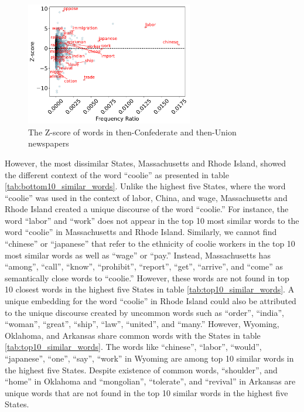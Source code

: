 \documentclass[11pt]{article}
\begin{document}
  \begin{figure}[h!]
    \centering
    \includegraphics[width=0.65\textwidth]{z-score-token-union-confederate.pdf}
    \caption{The Z-score of words in then-Confederate and then-Union newspapers}
    \label{fig:zscore}
  \end{figure}

However, the most dissimilar States, Massachusetts and Rhode Island, showed the different context of the word ``coolie''
as presented in table \ref{tab:bottom10_similar_words}. Unlike the highest five States, where the word ``coolie'' was used in the context of
labor, China, and wage, Massachusetts and Rhode Island created a unique discourse of the word ``coolie.''
For instance, the word ``labor'' and ``work'' does not appear in the top 10 most similar words to the word ``coolie'' in Massachusetts and Rhode Island.
Similarly, we cannot find ``chinese'' or ``japanese'' that refer to the ethnicity of coolie workers in the top 10 most similar words as well as ``wage'' or ``pay.''
Instead, Massachusetts has ``among'', ``call'', ``know'', ``prohibit'', ``report'', ``get'', ``arrive'', and ``come'' as
semantically close words to ``coolie.'' However, these words are not found in top 10 closest words in the highest five States in table \ref{tab:top10_similar_words}.
A unique embedding for the word ``coolie'' in Rhode Island could also be attributed to the unique discourse created by uncommon words
such as ``order'', ``india'', ``woman'', ``great'', ``ship'', ``law'', ``united'', and ``many.''
However, Wyoming, Oklahoma, and Arkansas share common words with the States in table \ref{tab:top10_similar_words}. 
The words like ``chinese'', ``labor'', ``would'', ``japanese'', ``one'', ``say'', ``work'' in Wyoming are among top 10 similar words in
the highest five States. Despite existence of common words, ``shoulder'', and ``home'' in Oklahoma and ``mongolian'', ``tolerate'', and ``revival''
in Arkansas are unique words that are not found in the top 10 similar words in the highest five States.
\end{document}

